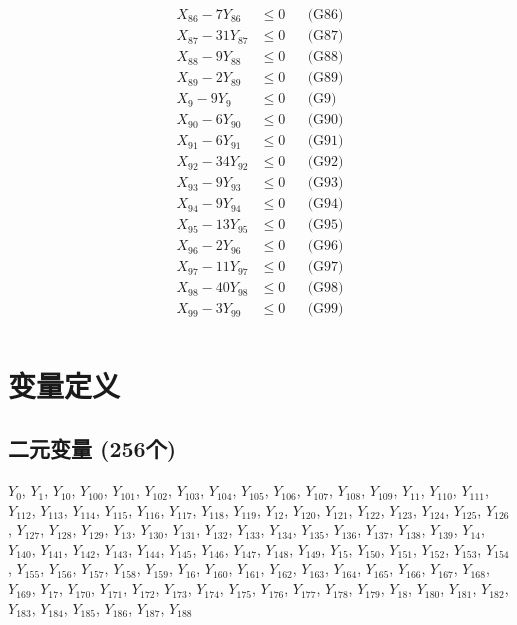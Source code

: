 \documentclass[a4paper,10pt]{article}
\begin{document}
{\begin{align}
X_{86} - 7Y_{86} &\leq 0 && \text{(G86)} \\
X_{87} - 31Y_{87} &\leq 0 && \text{(G87)} \\
X_{88} - 9Y_{88} &\leq 0 && \text{(G88)} \\
X_{89} - 2Y_{89} &\leq 0 && \text{(G89)} \\
X_{9} - 9Y_{9} &\leq 0 && \text{(G9)} \\
X_{90} - 6Y_{90} &\leq 0 && \text{(G90)} \\
X_{91} - 6Y_{91} &\leq 0 && \text{(G91)} \\
X_{92} - 34Y_{92} &\leq 0 && \text{(G92)} \\
X_{93} - 9Y_{93} &\leq 0 && \text{(G93)} \\
X_{94} - 9Y_{94} &\leq 0 && \text{(G94)} \\
X_{95} - 13Y_{95} &\leq 0 && \text{(G95)} \\
X_{96} - 2Y_{96} &\leq 0 && \text{(G96)} \\
X_{97} - 11Y_{97} &\leq 0 && \text{(G97)} \\
X_{98} - 40Y_{98} &\leq 0 && \text{(G98)} \\
X_{99} - 3Y_{99} &\leq 0 && \text{(G99)} \\
\end{align}}

\section{变量定义}

\subsection{二元变量 (256个)}

{\small $Y_{0}$, $Y_{1}$, $Y_{10}$, $Y_{100}$, $Y_{101}$, $Y_{102}$, $Y_{103}$, $Y_{104}$, $Y_{105}$, $Y_{106}$, $Y_{107}$, $Y_{108}$, $Y_{109}$, $Y_{11}$, $Y_{110}$, $Y_{111}$, $Y_{112}$, $Y_{113}$, $Y_{114}$, $Y_{115}$, $Y_{116}$, $Y_{117}$, $Y_{118}$, $Y_{119}$, $Y_{12}$, $Y_{120}$, $Y_{121}$, $Y_{122}$, $Y_{123}$, $Y_{124}$, $Y_{125}$, $Y_{126}$, $Y_{127}$, $Y_{128}$, $Y_{129}$, $Y_{13}$, $Y_{130}$, $Y_{131}$, $Y_{132}$, $Y_{133}$, $Y_{134}$, $Y_{135}$, $Y_{136}$, $Y_{137}$, $Y_{138}$, $Y_{139}$, $Y_{14}$, $Y_{140}$, $Y_{141}$, $Y_{142}$, $Y_{143}$, $Y_{144}$, $Y_{145}$, $Y_{146}$, $Y_{147}$, $Y_{148}$, $Y_{149}$, $Y_{15}$, $Y_{150}$, $Y_{151}$, $Y_{152}$, $Y_{153}$, $Y_{154}$, $Y_{155}$, $Y_{156}$, $Y_{157}$, $Y_{158}$, $Y_{159}$, $Y_{16}$, $Y_{160}$, $Y_{161}$, $Y_{162}$, $Y_{163}$, $Y_{164}$, $Y_{165}$, $Y_{166}$, $Y_{167}$, $Y_{168}$, $Y_{169}$, $Y_{17}$, $Y_{170}$, $Y_{171}$, $Y_{172}$, $Y_{173}$, $Y_{174}$, $Y_{175}$, $Y_{176}$, $Y_{177}$, $Y_{178}$, $Y_{179}$, $Y_{18}$, $Y_{180}$, $Y_{181}$, $Y_{182}$, $Y_{183}$, $Y_{184}$, $Y_{185}$, $Y_{186}$, $Y_{187}$, $Y_{188}$}
\end{document}

